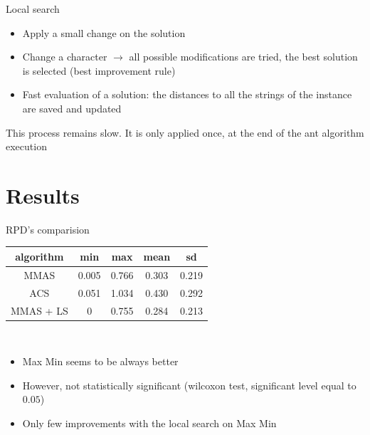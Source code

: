 \documentclass{beamer}
\begin{document}
\begin{frame}{Local search}

    \begin{itemize}
        \item Apply a small change on the solution
        \item Change a character $\rightarrow$  all possible modifications are tried, the best solution is selected (best improvement rule)
        \item Fast evaluation of a solution: the distances to all the strings of the instance are saved and updated
    \end{itemize}

    This process remains slow. It is only applied once, at the end of the ant algorithm execution

\end{frame}

\section{Results}

\begin{frame}{RPD's comparision}

    \centering
    \begin{tabular}{c|c|c|c|c}
        algorithm & min & max & mean & sd \\
        \hline
        MMAS & 0.005 & 0.766 & 0.303 & 0.219 \\
        ACS & 0.051 & 1.034 & 0.430  & 0.292 \\
        MMAS + LS & 0 & 0.755 & 0.284 & 0.213
    \end{tabular}\\

    \begin{itemize}
        \item Max Min seems to be always better
        \item However, not statistically significant (wilcoxon test, significant level equal to $0.05$)
        \item Only few improvements with the local search on Max Min
    \end{itemize}

\end{frame}
\end{document}
